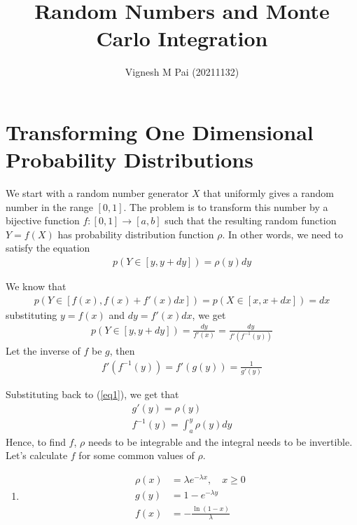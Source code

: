 \documentclass{article}
\title{Random Numbers and Monte Carlo Integration}
\author{Vignesh M Pai (20211132)}
\date{}
\begin{document}
\maketitle

\section{Transforming One Dimensional Probability Distributions}

We start with a random number generator $X$ that uniformly gives a random number in the
range $[0, 1]$. The problem is to transform this number by a bijective function $f: [0, 1] \to [a, b]$ such that the resulting
random function $Y=f(X)$ has probability distribution function $\rho$. In other words, we need to satisfy the equation
\begin{align}\label{eq1}
    p(Y \in [y, y + dy]) = \rho(y) dy
\end{align}

We know that
\begin{align}
    p(Y \in [f(x), f(x) + f'(x) dx]) = p(X \in [x, x + dx]) = dx
\end{align}
substituting $y = f(x)$ and $dy = f'(x) dx$, we get
\begin{align}
    p(Y \in [y, y + dy]) = \frac{dy}{f'(x)} = \frac{dy}{f'(f^{-1}(y))}
\end{align}
Let the inverse of $f$ be $g$, then
\begin{align}
    f'(f^{-1}(y)) = f'(g(y)) = \frac{1}{g'(y)}
\end{align}

Substituting back to (\ref{eq1}), we get that
\begin{gather*}
    g'(y) = \rho(y) \\
    f^{-1}(y) = \int_a^y \rho(y) dy
\end{gather*}
Hence, to find $f$, $\rho$ needs to be integrable and the integral needs to be invertible.
Let's calculate $f$ for some common values of $\rho$.

\begin{enumerate}
    \item
    \begin{align*}
        \rho(x) &= \lambda e^{-\lambda x},\quad x \geq 0 \\
        g(y) &= 1 - e^{-\lambda y} \\
        f(x) &= - \frac{\ln(1- x)}{\lambda}  
    \end{align*}
\end{enumerate}
\end{document}
